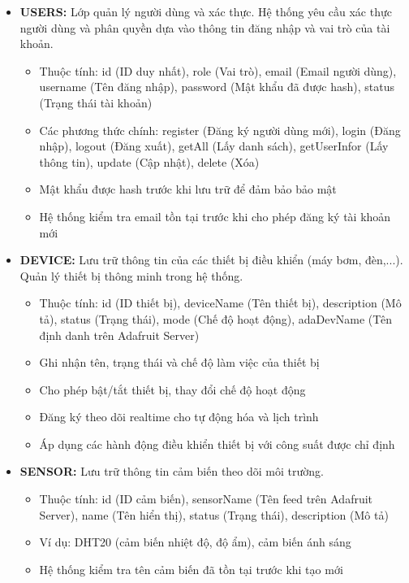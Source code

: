 \documentclass[12pt,a4paper]{article}
\begin{document}
\begin{itemize}
    \item \textbf{USERS: } Lớp quản lý người dùng và xác thực. Hệ thống yêu cầu xác thực người dùng và phân quyền dựa vào thông tin đăng nhập và vai trò của tài khoản.
    \begin{itemize}
        \item Thuộc tính: id (ID duy nhất), role (Vai trò), email (Email người dùng), username (Tên đăng nhập), password (Mật khẩu đã được hash), status (Trạng thái tài khoản)
        \item Các phương thức chính: register (Đăng ký người dùng mới), login (Đăng nhập), logout (Đăng xuất), getAll (Lấy danh sách), getUserInfor (Lấy thông tin), update (Cập nhật), delete (Xóa)
        \item Mật khẩu được hash trước khi lưu trữ để đảm bảo bảo mật
        \item Hệ thống kiểm tra email tồn tại trước khi cho phép đăng ký tài khoản mới
    \end{itemize}
    
    \item \textbf{DEVICE: } Lưu trữ thông tin của các thiết bị điều khiển (máy bơm, đèn,...). Quản lý thiết bị thông minh trong hệ thống.
    \begin{itemize}
        \item Thuộc tính: id (ID thiết bị), deviceName (Tên thiết bị), description (Mô tả), status (Trạng thái), mode (Chế độ hoạt động), adaDevName (Tên định danh trên Adafruit Server)
        \item Ghi nhận tên, trạng thái và chế độ làm việc của thiết bị
        \item Cho phép bật/tắt thiết bị, thay đổi chế độ hoạt động
        \item Đăng ký theo dõi realtime cho tự động hóa và lịch trình
        \item Áp dụng các hành động điều khiển thiết bị với công suất được chỉ định
    \end{itemize}

    \item \textbf{SENSOR: } Lưu trữ thông tin cảm biến theo dõi môi trường.
    \begin{itemize}
        \item Thuộc tính: id (ID cảm biến), sensorName (Tên feed trên Adafruit Server), name (Tên hiển thị), status (Trạng thái), description (Mô tả)
        \item Ví dụ: DHT20 (cảm biến nhiệt độ, độ ẩm), cảm biến ánh sáng
        \item Hệ thống kiểm tra tên cảm biến đã tồn tại trước khi tạo mới
    \end{itemize}


\end{itemize}
\end{document}
